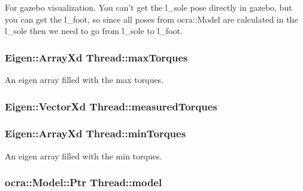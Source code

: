 \-For gazebo visualization. \-You can't get the l\-\_\-sole pose directly in gazebo, but you can get the l\-\_\-foot, so since all poses from ocra\-::\-Model are calculated in the l\-\_\-sole then we need to go from l\-\_\-sole to l\-\_\-foot. \hypertarget{classThread_af28a4fcbbcbf77c42237c0be75a25a54}{
\subsubsection[{max\-Torques}]{\setlength{\rightskip}{0pt plus 5cm}\-Eigen\-::\-Array\-Xd {\bf \-Thread\-::max\-Torques}}}\label{classThread_af28a4fcbbcbf77c42237c0be75a25a54}
\-An eigen array filled with the max torques. \hypertarget{classThread_aa9cbe8744e51571a17fa726d8d16a0c6}{
\subsubsection[{measured\-Torques}]{\setlength{\rightskip}{0pt plus 5cm}\-Eigen\-::\-Vector\-Xd {\bf \-Thread\-::measured\-Torques}}}\label{classThread_aa9cbe8744e51571a17fa726d8d16a0c6}
\hypertarget{classThread_a414015415c64371877d6028417c4f9e2}{
\subsubsection[{min\-Torques}]{\setlength{\rightskip}{0pt plus 5cm}\-Eigen\-::\-Array\-Xd {\bf \-Thread\-::min\-Torques}}}\label{classThread_a414015415c64371877d6028417c4f9e2}
\-An eigen array filled with the min torques. \hypertarget{classThread_a1dcef9aedc1a707e6f04d5fb6e4a0b13}{
\subsubsection[{model}]{\setlength{\rightskip}{0pt plus 5cm}ocra\-::\-Model\-::\-Ptr {\bf \-Thread\-::model}}}\label{classThread_a1dcef9aedc1a707e6f04d5fb6e4a0b13}
